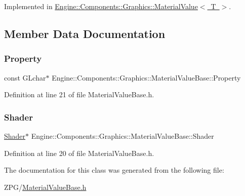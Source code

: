 Implemented in \mbox{\hyperlink{classEngine_1_1Components_1_1Graphics_1_1MaterialValue_a88dbac3446bf9e78c7411e79c1b58977}{Engine\+::\+Components\+::\+Graphics\+::\+Material\+Value$<$ T $>$}}.



\subsection{Member Data Documentation}
\mbox{\label{classEngine_1_1Components_1_1Graphics_1_1MaterialValueBase_a53f5d1edea5f564931535250d3f5039c}} 
\subsubsection{\texorpdfstring{Property}{Property}}
{\footnotesize\ttfamily const G\+Lchar$\ast$ Engine\+::\+Components\+::\+Graphics\+::\+Material\+Value\+Base\+::\+Property}



Definition at line 21 of file Material\+Value\+Base.\+h.

\mbox{\label{classEngine_1_1Components_1_1Graphics_1_1MaterialValueBase_a45fd55d67557a2975f1274aa41045512}} 
\subsubsection{\texorpdfstring{Shader}{Shader}}
{\footnotesize\ttfamily \mbox{\hyperlink{classEngine_1_1Components_1_1Graphics_1_1Shader}{Shader}}$\ast$ Engine\+::\+Components\+::\+Graphics\+::\+Material\+Value\+Base\+::\+Shader}



Definition at line 20 of file Material\+Value\+Base.\+h.



The documentation for this class was generated from the following file\+:\begin{DoxyCompactItemize}
\item 
Z\+P\+G/\mbox{\hyperlink{MaterialValueBase_8h}{Material\+Value\+Base.\+h}}\end{DoxyCompactItemize}

